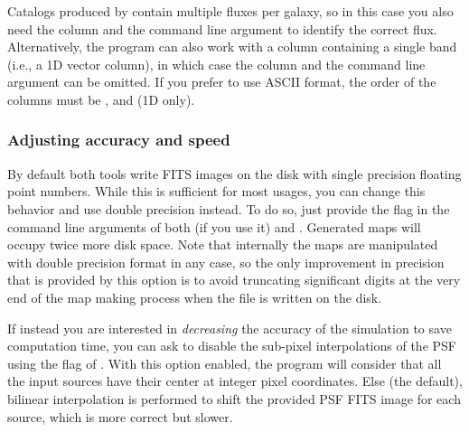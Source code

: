 Catalogs produced by  contain multiple fluxes per galaxy, so in this case you also need the  column and the  command line argument to identify the correct flux. Alternatively, the program can also work with a  column containing a single band (i.e., a 1D vector column), in which case the  column and the  command line argument can be omitted. If you prefer to use ASCII format, the order of the columns must be ,  and  (1D only).


\subsubsection{Adjusting accuracy and speed}

By default both tools write FITS images on the disk with single precision floating point numbers. While this is sufficient for most usages, you can change this behavior and use double precision instead. To do so, just provide the  flag in the command line arguments of both  (if you use it) and . Generated maps will occupy twice more disk space. Note that internally the maps are manipulated with double precision format in any case, so the only improvement in precision that is provided by this option is to avoid truncating significant digits at the very end of the map making process when the file is written on the disk.

If instead you are interested in \emph{decreasing} the accuracy of the simulation to save computation time, you can ask to disable the sub-pixel interpolations of the PSF using the  flag of . With this option enabled, the program will consider that all the input sources have their center at integer pixel coordinates. Else (the default), bilinear interpolation is performed to shift the provided PSF FITS image for each source, which is more correct but slower.
